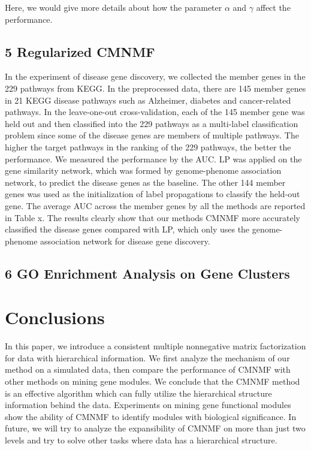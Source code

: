 \documentclass{bmcart}
\begin{document}
Here, we would give more details about how the parameter $\alpha$ and $\gamma$ affect the performance.
\subsection*{5 Regularized CMNMF}
In the experiment of disease gene discovery, we collected the member genes in the 229 pathways from KEGG. In the preprocessed data, there are 145 member genes in 21 KEGG disease pathways such as Alzheimer, diabetes and cancer-related pathways. In the leave-one-out cross-validation, each of the 145 member gene was held out and then classified into the 229 pathways as a multi-label classification problem since some of the disease genes are
members of multiple pathways. The higher the target pathways in the ranking of the 229 pathways, the better the performance. We measured the performance by the AUC. LP was applied on the gene similarity network, which was formed by genome-phenome association network, to predict the disease genes as the baseline. The other 144 member genes was used as the initialization of label propagations to classify the held-out gene. The average AUC across the  member genes by all the methods are reported in Table x. The results clearly show that our methods CMNMF more accurately classified the disease genes compared with LP, which only uses the genome-phenome association network for disease gene discovery.

\subsection*{6 GO Enrichment Analysis on Gene Clusters}


\section*{Conclusions}
In this paper, we introduce a consistent multiple nonnegative matrix factorization for data with hierarchical information. We first analyze the mechanism of our method on a simulated data, then compare the performance of CMNMF with other methods on mining gene modules. We conclude that the CMNMF method is an effective algorithm which can fully utilize the hierarchical structure information behind the data. Experiments on mining gene functional modules show the ability of CMNMF to identify modules with biological significance. In future, we will try to analyze the expansibility of CMNMF on more than just two levels and try to solve other tasks where data has a hierarchical structure.
\end{document}
